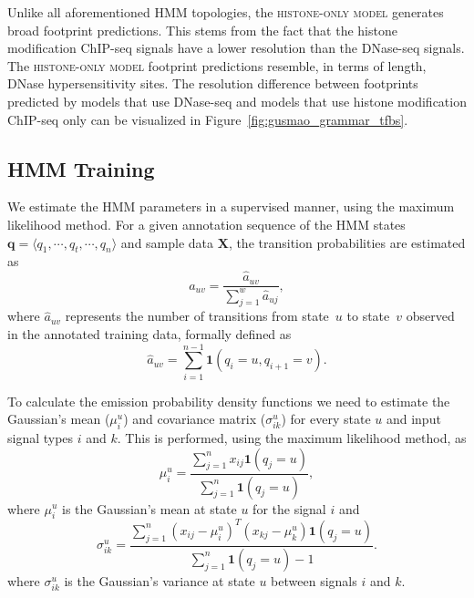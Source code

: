 Unlike all aforementioned HMM topologies, the \textsc{histone-only model} generates broad footprint predictions. This stems from the fact that the histone modification ChIP-seq signals have a lower resolution than the DNase-seq signals. The \textsc{histone-only model} footprint predictions resemble, in terms of length, DNase hypersensitivity sites. The resolution difference between footprints predicted by models that use DNase-seq and models that use histone modification ChIP-seq only can be visualized in Figure~\ref{fig:gusmao_grammar_tfbs}.

\subsection{HMM Training}
\label{sec:hmm.training}

We estimate the HMM parameters in a supervised manner, using the maximum likelihood method. For a given annotation sequence of the HMM states $\mathbf{q} = \langle q_1, \cdots, q_t, \cdots, q_n \rangle$ and sample data $\mathbf{X}$, the transition probabilities are estimated as
\begin{equation}
  \label{eq:hmm.train.a.1}
  a_{uv} = \frac{ \hat{a}_{uv}}{ \sum_{j=1}^{w} \hat{a}_{uj}},
\end{equation}
where $ \hat{a}_{uv} $ represents the number of transitions from state~$u$ to state~$v$ observed in the annotated training data, formally defined as
\begin{equation}
  \label{eq:hmm.train.a.2}
  \hat{a}_{uv} = \sum_{i=1}^{n-1} \mathbf{1} (q_i=u, q_{i+1}=v).
\end{equation}

To calculate the emission probability density functions we need to estimate the Gaussian's mean ($\mu^{u}_{i}$) and covariance matrix (${\sigma}^{u}_{ik}$) for every state $u$ and input signal types $i$ and $k$. This is performed, using the maximum likelihood method, as
\begin{equation}
  \label{eq:hmm.train.e.1}
  \mu^{u}_{i} = \frac{ \sum_{j=1}^{n} {x}_{ij} {\mathbf{1}}(q_j=u) }{ \sum_{j=1}^{n} {\mathbf{1}} (q_j=u) },
\end{equation}
where $ \mu^{u}_{i} $ is the Gaussian's mean at state $u$ for the signal $i$ and
\begin{equation}
  \label{eq:hmm.train.e.2}
  {\sigma}^{u}_{ik} = \frac{\sum_{j=1}^{n} ({x}_{ij} - \mu^{u}_{i})^T({x}_{kj} - \mu^{u}_{k}) {\mathbf{1}} (q_j=u)}
  {\sum_{j=1}^{n} {\mathbf{1}} (q_j=u) - 1}.
\end{equation}
where $ \sigma^{u}_{ik} $ is the Gaussian's variance at state $u$ between signals $i$ and $k$.

